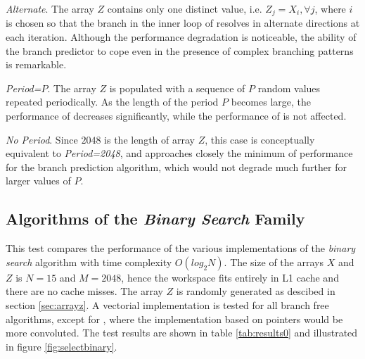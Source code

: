 \documentclass[preprint,1p,times]{elsarticle}
\begin{document}
\textit{Alternate}. The array $Z$ contains only one distinct value, i.e. $Z_j=X_i, \forall j$, where $i$ is chosen so that the branch in the inner loop of \textit{\ClassicName} resolves in alternate directions at each iteration. Although the performance degradation is noticeable, the ability of the branch predictor to cope even in the presence of complex branching patterns is remarkable.

\textit{Period=$P$}. The array $Z$ is populated with a sequence of $P$ random values repeated periodically. As the length of the period $P$ becomes large, the performance of \textit{\ClassicName} decreases significantly, while the performance of \textit{\ClassicModName} is not affected.

\textit{No Period}. Since $2048$ is the length of array $Z$, this case is conceptually equivalent to \textit{Period=2048}, and approaches closely the minimum of performance for the branch prediction algorithm, which would not degrade much further for larger values of $P$.

\subsection{Algorithms of the \textit{Binary Search} Family}
\label{sec:testbinalg}
This test compares the performance of the various implementations of the \textit{binary search} algorithm with time complexity $O(log_2N)$.
The size of the arrays $X$ and $Z$ is $N=15$ and $M=2048$, hence the workspace fits entirely in L1 cache and there are no cache misses.
The array $Z$ is randomly generated as descibed in section \ref{sec:arrayz}.
A vectorial implementation is tested for all branch free algorithms, except for \textit{\MorinOffsetName}, where the implementation based on pointers would be more convoluted.
The test results are shown in table \ref{tab:results0} and illustrated in figure \ref{fig:selectbinary}.
\end{document}
